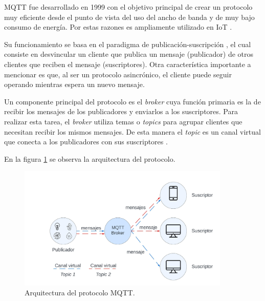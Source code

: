 MQTT fue desarrollado en 1999 con el objetivo principal de crear un protocolo muy eficiente desde el punto de vista del uso del ancho de banda y de muy bajo consumo de energía. Por estas razones es ampliamente utilizado en IoT \citep{mqtt:1}.

Su funcionamiento se basa en el paradigma de publicación-suscripción \citep{pubsub}, el cual consiste en desvincular un cliente que publica un mensaje (publicador) de otros clientes que reciben el mensaje (suscriptores). Otra característica importante a mencionar es que, al ser un protocolo asincrónico, el cliente puede seguir operando mientras espera un nuevo mensaje.





Un componente principal del protocolo es el \textit{broker} cuya función primaria es la de recibir los mensajes de los publicadores y enviarlos a los  suscriptores. Para realizar esta tarea, el \textit{broker} utiliza temas o \textit{topics} para agrupar clientes que necesitan recibir los mismos mensajes. De esta manera el \textit{topic} es un canal virtual que conecta a los publicadores con sus suscriptores \citep{mqtt:1}.

En la figura \ref{fig:arqmqtt} se observa la arquitectura del protocolo.
\begin{figure}[h]
	\centering
	\includegraphics[width=0.90\textwidth]{./Figures/mqtt.jpeg}
	\caption[Arquitectura del protocolo MQTT]{Arquitectura del protocolo MQTT.}
	\label{fig:arqmqtt}

\end{figure}





